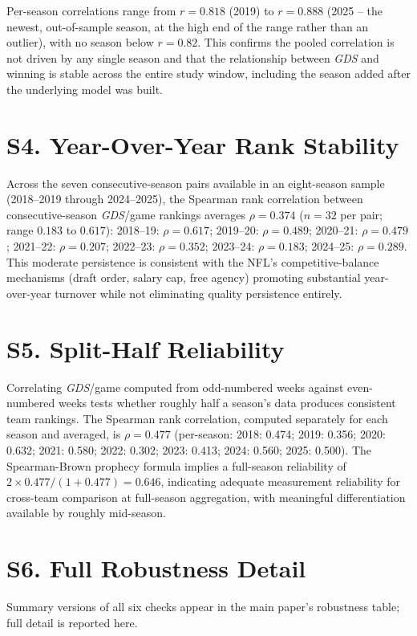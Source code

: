 \documentclass[12pt,a4paper]{article}
\newcommand{\gds}{\textit{GDS}}
\begin{document}
Per-season correlations range from $r = 0.818$ (2019) to $r = 0.888$ (2025 -- the newest,
out-of-sample season, at the high end of the range rather than an outlier), with no season
below $r = 0.82$. This confirms the pooled correlation is not driven by any single season and
that the relationship between \gds{} and winning is stable across the entire study window,
including the season added after the underlying model was built.

\section*{S4. Year-Over-Year Rank Stability}

Across the seven consecutive-season pairs available in an eight-season sample (2018--2019
through 2024--2025), the Spearman rank correlation between consecutive-season \gds{}/game
rankings averages $\rho = 0.374$ ($n = 32$ per pair; range $0.183$ to $0.617$):
2018--19: $\rho=0.617$; 2019--20: $\rho=0.489$; 2020--21: $\rho=0.479$; 2021--22: $\rho=0.207$;
2022--23: $\rho=0.352$; 2023--24: $\rho=0.183$; 2024--25: $\rho=0.289$. This moderate
persistence is consistent with the NFL's competitive-balance mechanisms (draft order, salary
cap, free agency) promoting substantial year-over-year turnover while not eliminating quality
persistence entirely.

\section*{S5. Split-Half Reliability}

Correlating \gds{}/game computed from odd-numbered weeks against even-numbered weeks tests
whether roughly half a season's data produces consistent team rankings. The Spearman rank
correlation, computed separately for each season and averaged, is $\rho = 0.477$ (per-season:
2018: 0.474; 2019: 0.356; 2020: 0.632; 2021: 0.580; 2022: 0.302; 2023: 0.413; 2024: 0.560; 2025:
0.500). The Spearman-Brown prophecy formula implies a full-season reliability of
$2 \times 0.477 / (1 + 0.477) = 0.646$, indicating adequate measurement reliability for
cross-team comparison at full-season aggregation, with meaningful differentiation available by
roughly mid-season.

\section*{S6. Full Robustness Detail}

Summary versions of all six checks appear in the main paper's robustness table; full detail is
reported here.
\end{document}
